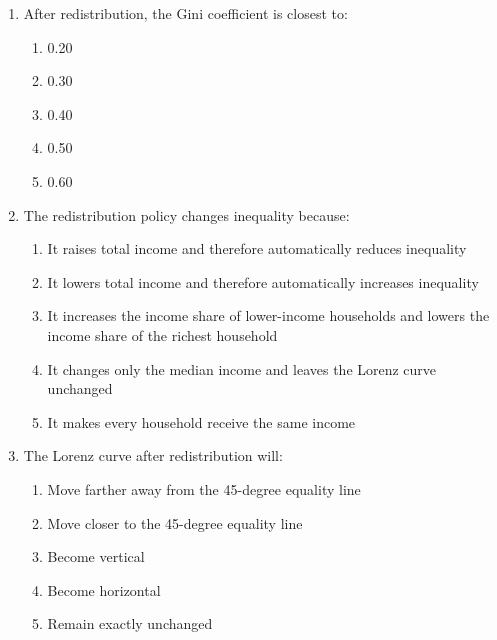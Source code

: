 \documentclass[12pt]{article}
\begin{document}
\begin{enumerate}[label=\textbf{\arabic*.}]
\item After redistribution, the Gini coefficient is closest to:
\begin{enumerate}[label=\Alph*.]
\item 0.20
\item 0.30
\item 0.40
\item 0.50
\item 0.60
\end{enumerate}

\item The redistribution policy changes inequality because:
\begin{enumerate}[label=\Alph*.]
\item It raises total income and therefore automatically reduces inequality
\item It lowers total income and therefore automatically increases inequality
\item It increases the income share of lower-income households and lowers the income share of the richest household
\item It changes only the median income and leaves the Lorenz curve unchanged
\item It makes every household receive the same income
\end{enumerate}

\item The Lorenz curve after redistribution will:
\begin{enumerate}[label=\Alph*.]
\item Move farther away from the 45-degree equality line
\item Move closer to the 45-degree equality line
\item Become vertical
\item Become horizontal
\item Remain exactly unchanged
\end{enumerate}


\end{enumerate}
\end{document}
